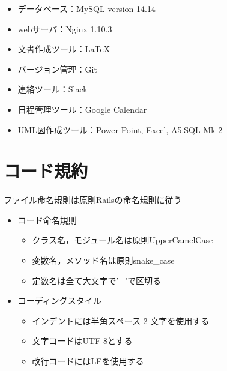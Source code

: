 \begin{itemize}
\item データベース：MySQL version 14.14

\item webサーバ：Nginx 1.10.3

\item 文書作成ツール：LaTeX

\item バージョン管理：Git

\item 連絡ツール：Slack

\item 日程管理ツール：Google Calendar

\item UML図作成ツール：Power Point, Excel, A5:SQL Mk-2

\end{itemize}

\section{コード規約}
ファイル命名規則は原則Railsの命名規則に従う

\begin{itemize}
\item コード命名規則
  \begin{itemize}
  \item クラス名，モジュール名は原則UpperCamelCase
  \item 変数名，メソッド名は原則snake\_case
  \item 定数名は全て大文字で'\_'で区切る
\end{itemize}
\item コーディングスタイル
\begin{itemize}
  \item インデントには半角スペース 2 文字を使用する
  \item 文字コードはUTF-8とする
  \item 改行コードにはLFを使用する
  \end{itemize}
\end{itemize}
